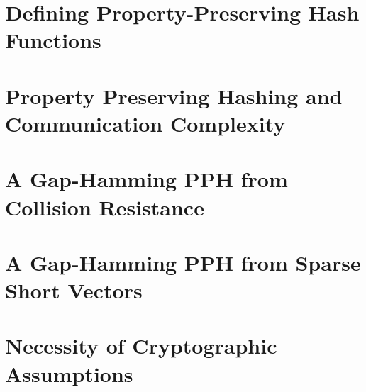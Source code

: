 %

\section{Defining Property-Preserving Hash Functions}
\label{sec:pph-definitions}\label{sec:pph-defs}




\section{Property Preserving Hashing and Communication Complexity}\label{sec:owc-relations}

%
%

\section{A Gap-Hamming PPH from Collision Resistance}\label{sec:construction1}

%

\section{A Gap-Hamming PPH from Sparse Short Vectors}
\label{sec:ham}


\section{Necessity of Cryptographic Assumptions}\label{sec:lb}

%

